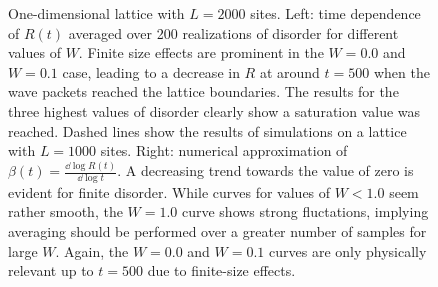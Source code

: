 \documentclass[10pt,a4paper]{article}
\begin{document}
\begin{figure}[H]
\caption{One-dimensional lattice with $L=2000$ sites. Left: time dependence of $R(t)$ averaged over 200 realizations of disorder for different values of $W$. Finite size effects are prominent in the $W=0.0$ and $W=0.1$ case, leading to a decrease in $R$ at around $t=500$ when the wave packets reached the lattice boundaries. The results for the three highest values of disorder clearly show a saturation value was reached. Dashed lines show the results of simulations on a lattice with $L=1000$ sites. Right: numerical approximation of $\beta(t)=\frac{\dd \log R(t)}{\dd \log t}$. A decreasing trend towards the value of zero is evident for finite disorder.  While curves for values of $W<1.0$ seem rather smooth, the $W=1.0$ curve shows strong fluctations, implying averaging should be performed over a greater number of samples for large $W$. Again, the $W=0.0$ and $W=0.1$ curves are only physically relevant up to $t=500$ due to finite-size effects. }
\label{fig:1D_rsq} 
\end{figure}
 
\end{document}
